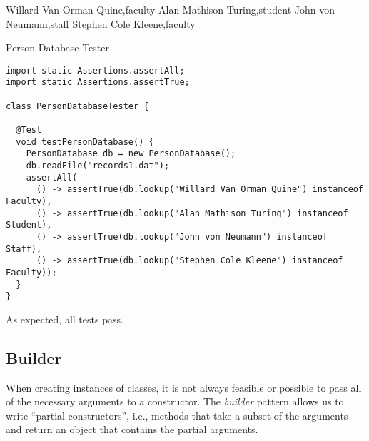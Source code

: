 \begin{verbnobox}[\footnotesize]
Willard Van Orman Quine,faculty
Alan Mathison Turing,student
John von Neumann,staff
Stephen Cole Kleene,faculty
\end{verbnobox}

\begin{cl}{Person Database Tester}
\begin{lstlisting}[language=MyJava]
import static Assertions.assertAll;
import static Assertions.assertTrue;

class PersonDatabaseTester {

  @Test
  void testPersonDatabase() {
    PersonDatabase db = new PersonDatabase();
    db.readFile("records1.dat");
    assertAll(
      () -> assertTrue(db.lookup("Willard Van Orman Quine") instanceof Faculty),
      () -> assertTrue(db.lookup("Alan Mathison Turing") instanceof Student),
      () -> assertTrue(db.lookup("John von Neumann") instanceof Staff),
      () -> assertTrue(db.lookup("Stephen Cole Kleene") instanceof Faculty));
  }
}
\end{lstlisting}
\end{cl}

As expected, all tests pass.

\subsection*{Builder}

When creating instances of classes, it is not always feasible or possible to pass all of the necessary arguments to a constructor. The \textit{builder} pattern allows us to write ``partial constructors'', i.e., methods that take a subset of the arguments and return an object that contains the partial arguments. 


